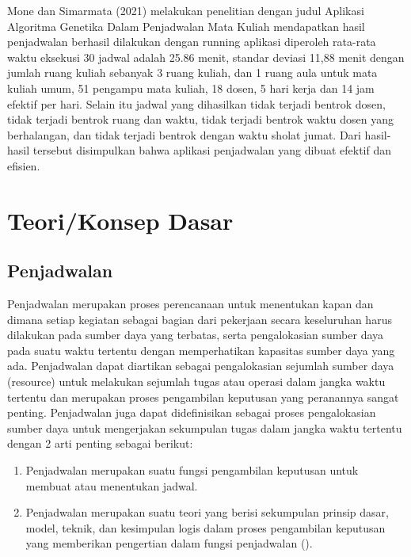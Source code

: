 Mone dan Simarmata (2021) melakukan penelitian dengan judul 
Aplikasi Algoritma \linebreak Genetika Dalam Penjadwalan Mata Kuliah mendapatkan hasil 
penjadwalan berhasil dilakukan dengan running aplikasi diperoleh rata-rata waktu eksekusi 
30 jadwal adalah 25.86 menit, standar deviasi 11,88 menit dengan jumlah ruang kuliah sebanyak 3 
ruang kuliah, dan 1 ruang aula untuk mata kuliah umum, 51 pengampu mata kuliah, 18 dosen, 5 hari 
kerja dan 14 jam efektif per hari. Selain itu jadwal yang dihasilkan tidak terjadi bentrok dosen, 
tidak terjadi bentrok ruang dan waktu, tidak terjadi bentrok waktu dosen yang berhalangan, 
dan tidak terjadi bentrok dengan waktu sholat jumat. Dari hasil-hasil tersebut disimpulkan 
bahwa aplikasi penjadwalan yang dibuat efektif dan efisien.

\section{Teori/Konsep Dasar}
\label{sec:teori}
\subsection{Penjadwalan}
\label{subsec:penjadwalan}
Penjadwalan merupakan proses perencanaan untuk menentukan kapan dan dimana setiap \linebreak kegiatan sebagai bagian dari pekerjaan secara keseluruhan harus dilakukan pada sumber daya yang terbatas, serta pengalokasian sumber daya pada suatu waktu tertentu dengan memperhatikan kapasitas sumber daya yang ada. 
Penjadwalan dapat diartikan sebagai pengalokasian sejumlah sumber daya (resource) untuk melakukan sejumlah tugas atau operasi dalam jangka waktu tertentu dan merupakan proses pengambilan keputusan yang peranannya sangat penting. 
Penjadwalan juga dapat didefinisikan sebagai proses pengalokasian sumber daya untuk mengerjakan sekumpulan tugas dalam jangka waktu tertentu dengan 2 arti penting sebagai berikut: 
\begin{enumerate}
  \item Penjadwalan merupakan suatu fungsi pengambilan keputusan untuk membuat atau \linebreak menentukan jadwal. 
  \item Penjadwalan merupakan suatu teori yang berisi sekumpulan prinsip dasar, model, teknik, dan kesimpulan logis dalam proses pengambilan keputusan yang memberikan pengertian dalam fungsi penjadwalan (\cite{prasetya2017penjadwalan}).
\end{enumerate}

